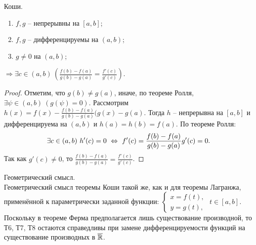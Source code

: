 \begin{theorem}\hypertarget{koshi_o_srednem}{Коши.}
    \begin{enumerate}
        \item $f, g$ -- непрерывны на $[a,b]$;
        \item $f, g$ -- дифференцируемы на $(a,b)$;
        \item $g \neq 0$ на $(a,b)$;
    \end{enumerate}
    $\Rightarrow \exists c \in (a,b) \ (\frac{f(b) - f(a)}{g(b) - g(a)} = \frac{f'(c)}{g'(c)})$.
\end{theorem}

\begin{proof}
    Отметим, что $g(b) \neq g(a)$, иначе, по теореме Ролля, $\exists \psi \in (a,b) \ (g(\psi) = 0)$. Рассмотрим $h(x)=f(x) - \frac{f(b) - f(a)}{g(b) - g(a)}(g(x) - g(a)$. Тогда $h$ -- непрерывна на $[a,b]$ и дифференцируема на $(a,b)$ и $h(a) = h(b) = f(a)$. По теореме Ролля:
    \[\exists c \in (a,b) \ h'(c) = 0 \ \lra \ f'(c) = \frac{f(b) - f(a)}{g(b) - g(a)}g'(c) = 0.\]
    Так как $g'(c) \neq 0$, то $\frac{f(b) - f(a)}{g(b) - g(a)} = \frac{f'(c)}{g'(c)}$.
\end{proof}

\begin{note}{Геометрический смысл.}\\
    Геометрический смысл теоремы Коши такой же, как и для теоремы Лагранжа, применённой к параметрически заданной функции:
    $\begin{cases}
        x = f(t),\\
        y = g(t),
    \end{cases}$
    $t \in [a,b]$.
    Поскольку в теореме Ферма предполагается лишь существование производной, то Т6, Т7, Т8 остаются справедливы при замене дифференцируемости функций на существование производных в $\overline{\mathbb{R}}$.
\end{note}